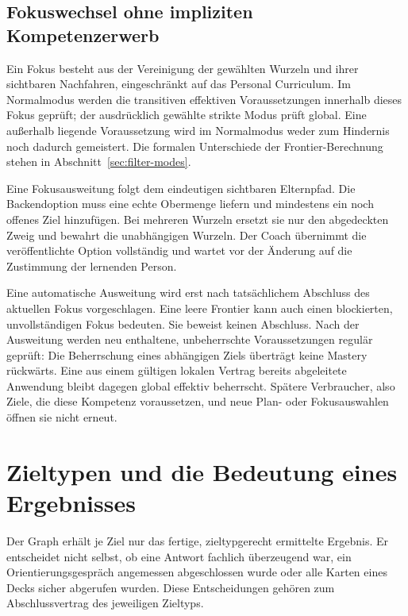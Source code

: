 \subsection{Fokuswechsel ohne impliziten Kompetenzerwerb}

Ein Fokus besteht aus der Vereinigung der gewählten Wurzeln und ihrer
sichtbaren Nachfahren, eingeschränkt auf das Personal Curriculum.
Im Normalmodus werden die transitiven effektiven Voraussetzungen innerhalb
dieses Fokus geprüft; der ausdrücklich gewählte strikte Modus prüft global.
Eine außerhalb liegende Voraussetzung wird im Normalmodus weder zum
Hindernis noch dadurch gemeistert. Die formalen Unterschiede der
Frontier-Berechnung stehen in Abschnitt~\ref{sec:filter-modes}.

Eine Fokusausweitung folgt dem eindeutigen sichtbaren Elternpfad. Die
Backendoption muss eine echte Obermenge liefern und mindestens ein
noch offenes Ziel hinzufügen. Bei mehreren Wurzeln ersetzt sie nur den
abgedeckten Zweig und bewahrt die unabhängigen Wurzeln. Der Coach
übernimmt die veröffentlichte Option vollständig und wartet vor der
Änderung auf die Zustimmung der lernenden Person.

Eine automatische Ausweitung wird erst nach tatsächlichem Abschluss
des aktuellen Fokus vorgeschlagen. Eine leere Frontier kann auch einen
blockierten, unvollständigen Fokus bedeuten. Sie beweist keinen
Abschluss. Nach der Ausweitung werden neu enthaltene, unbeherrschte
Voraussetzungen regulär geprüft: Die Beherrschung eines abhängigen Ziels
überträgt keine Mastery rückwärts. Eine aus einem gültigen lokalen Vertrag
bereits abgeleitete Anwendung bleibt dagegen global effektiv beherrscht.
Spätere Verbraucher, also Ziele, die diese Kompetenz voraussetzen, und neue
Plan- oder Fokusauswahlen öffnen sie nicht erneut.


\section{Zieltypen und die Bedeutung eines Ergebnisses}
\label{sec:goal-types}

Der Graph erhält je Ziel nur das fertige, zieltypgerecht ermittelte
Ergebnis. Er entscheidet
nicht selbst, ob eine Antwort fachlich überzeugend war, ein
Orientierungsgespräch angemessen abgeschlossen wurde oder alle
Karten eines Decks sicher abgerufen wurden. Diese Entscheidungen
gehören zum Abschlussvertrag des jeweiligen Zieltyps.

